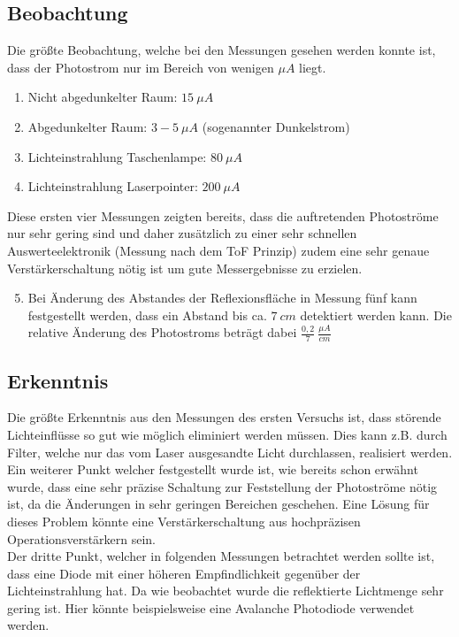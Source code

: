 \subsection{Beobachtung}
Die größte Beobachtung, welche bei den Messungen gesehen werden konnte ist, dass der Photostrom nur im Bereich von wenigen $\mu A$ liegt.
\begin{enumerate}
	\item Nicht abgedunkelter Raum: $15\:\mu A$ 
	\item Abgedunkelter Raum: $3-5\:\mu A$  (sogenannter Dunkelstrom)
	\item Lichteinstrahlung Taschenlampe: $80\:\mu A$ 
	\item Lichteinstrahlung Laserpointer: $200\:\mu A$
\end{enumerate}
Diese ersten vier Messungen zeigten bereits, dass die auftretenden Photoströme nur sehr gering sind und daher zusätzlich zu einer sehr schnellen Auswerteelektronik (Messung nach dem \ac{ToF} Prinzip) zudem eine sehr genaue Verstärkerschaltung nötig ist um gute Messergebnisse zu erzielen.
\begin{enumerate}
	\setcounter{enumi}{4}
	\item Bei Änderung des Abstandes der Reflexionsfläche in Messung fünf kann festgestellt werden, dass ein Abstand bis ca. $7\:cm$ detektiert werden kann. Die relative Änderung des Photostroms beträgt dabei $\frac{0,2}{7}\:\frac{\mu A}{cm}$
\end{enumerate}
\subsection{Erkenntnis}
Die größte Erkenntnis aus den Messungen des ersten Versuchs ist, dass störende Lichteinflüsse so gut wie möglich eliminiert werden müssen. Dies kann z.B. durch Filter, welche nur das vom Laser ausgesandte Licht durchlassen, realisiert werden.\\
Ein weiterer Punkt welcher festgestellt wurde ist, wie bereits schon erwähnt wurde, dass eine sehr präzise Schaltung zur Feststellung der Photoströme nötig ist, da die Änderungen in sehr geringen Bereichen geschehen. Eine Lösung für dieses Problem könnte eine Verstärkerschaltung aus hochpräzisen Operationsverstärkern sein.\\
Der dritte Punkt, welcher in folgenden Messungen betrachtet werden sollte ist, dass eine Diode mit einer höheren Empfindlichkeit gegenüber der Lichteinstrahlung hat. Da wie beobachtet wurde die reflektierte Lichtmenge sehr gering ist. Hier könnte beispielsweise eine Avalanche Photodiode verwendet werden.

